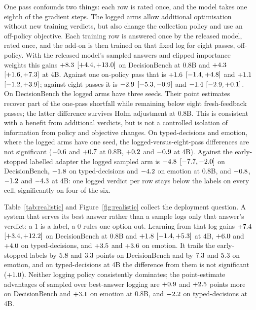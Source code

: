 One pass confounds two things: each row is rated once, and the model takes one eighth of the gradient steps. The logged arms allow additional optimisation without new training verdicts, but also change the collection policy and use an off-policy objective. Each training row is answered once by the released model, rated once, and the add-on is then trained on that fixed log for eight passes, off-policy. With the released model's sampled answers and clipped importance weights this gains $+8.3$ $[+4.4, +13.0]$ on DecisionBench at 0.8B and $+4.3$ $[+1.6, +7.3]$ at 4B. Against one on-policy pass that is $+1.6$ $[-1.4, +4.8]$ and $+1.1$ $[-1.2, +3.9]$; against eight passes it is $-2.9$ $[-5.3, -0.9]$ and $-1.4$ $[-2.9, +0.1]$. On DecisionBench the logged arms have three seeds. Their point estimates recover part of the one-pass shortfall while remaining below eight fresh-feedback passes; the latter difference survives Holm adjustment at 0.8B. This is consistent with a benefit from additional verdicts, but is not a controlled isolation of information from policy and objective changes. On typed-decisions and emotion, where the logged arms have one seed, the logged-versus-eight-pass differences are not significant ($-0.6$ and $+0.7$ at 0.8B, $+0.2$ and $-0.9$ at 4B). Against the early-stopped labelled adapter the logged sampled arm is $-4.8$ $[-7.7, -2.0]$ on DecisionBench, $-1.8$ on typed-decisions and $-4.2$ on emotion at 0.8B, and $-0.8$, $-1.2$ and $-4.3$ at 4B: one logged verdict per row stays below the labels on every cell, significantly on four of the six.

Table~\ref{tab:realistic} and Figure~\ref{fig:realistic} collect the deployment question. A system that serves its best answer rather than a sample logs only that answer's verdict: a 1 is a label, a 0 rules one option out. Learning from that log gains $+7.4$ $[+3.4, +12.2]$ on DecisionBench at 0.8B and $+1.8$ $[-1.4, +5.3]$ at 4B, $+6.0$ and $+4.0$ on typed-decisions, and $+3.5$ and $+3.6$ on emotion. It trails the early-stopped labels by $5.8$ and $3.3$ points on DecisionBench and by $7.3$ and $5.3$ on emotion, and on typed-decisions at 4B the difference from them is not significant ($+1.0$). Neither logging policy consistently dominates; the point-estimate advantages of sampled over best-answer logging are $+0.9$ and $+2.5$ points more on DecisionBench and $+3.1$ on emotion at 0.8B, and $-2.2$ on typed-decisions at 4B.

